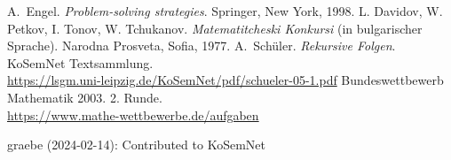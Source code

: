 \documentclass[11pt,a4paper]{article}
\begin{document}
\begin{thebibliography}{Wor77}

 A.~Engel.  \newblock \emph{Problem-solving strategies}.
  \newblock Springer, New York, 1998.
 L. Davidov, W. Petkov, I. Tonov, W. Tchukanov.  \newblock
  \emph{Matematitcheski Konkursi} (in bulgarischer Sprache). \newblock Narodna
  Prosveta, Sofia, 1977.
 A.~Schüler.  \newblock \emph{Rekursive Folgen}.
  \newblock KoSemNet Textsammlung.\\
  \url{https://lsgm.uni-leipzig.de/KoSemNet/pdf/schueler-05-1.pdf}
 Bundeswettbewerb Mathematik 2003. 2. Runde.\\
  \url{https://www.mathe-wettbewerbe.de/aufgaben}

\end{thebibliography}

\begin{attribution}
graebe (2024-02-14): Contributed to KoSemNet
\end{attribution}

 
\end{document}
